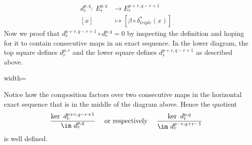 \begin{definition}
	\begin{align*}
		d_r^{p,q}: ~E^{p,q}_r &  \to E^{p+r,q-r+1}_{r}\\
		[x]                   &  \mapsto [\beta\circ \delta^*_{triple}(x)]
	\end{align*}
	Now we proof that $d^{p+r,q-r+1}_r\circ d^{p,q}_r=0$ by inspecting the definition and hoping for it to contain consecutive maps in an exact sequence. In the lower diagram, the top square defines $d^{p,r}_r$ and the lower square defines $d^{p+r,q-r+1}_r$ as described above. 
	\begin{center}
		\begin{adjustbox}{width=\textwidth}
		\end{adjustbox}
	\end{center}
	Notice how the composition factors over two consecutive maps in the horizontal exact sequence that is in the middle of the diagram above. Hence the quotient 
	\begin{equation*}
		\frac{\ker~ d^{p+r,q-r+1}_r}{\im~ d^{p,q}_r} \quad \text{ or respectively } \quad \frac{\ker~d^{p,q}_r}{\im ~ d_r^{p-r,q+r-1}}
	\end{equation*} is well defined. 
\end{definition}

